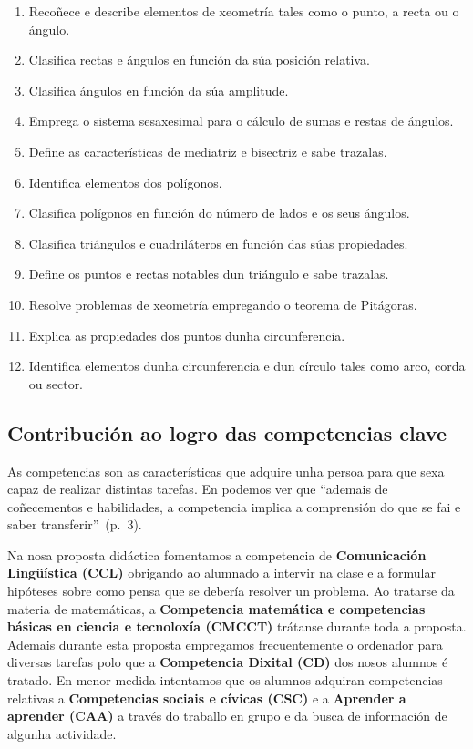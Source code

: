 \begin{enumerate}[label=\bfseries Est\arabic*]
 \item\label{est1} Recoñece e describe elementos de xeometría tales como o punto, a recta ou o ángulo.
 \item\label{est2} Clasifica rectas e ángulos en función da súa posición relativa.
 \item\label{est3} Clasifica ángulos en función da súa amplitude.
 \item\label{est4} Emprega o sistema sesaxesimal para o cálculo de sumas e restas de ángulos.
 \item\label{est5} Define as características de mediatriz e bisectriz e sabe trazalas.
 \item\label{est6} Identifica elementos dos polígonos.
 \item\label{est7} Clasifica polígonos en función do número de lados e os seus ángulos.
 \item\label{est8} Clasifica triángulos e cuadriláteros en función das súas propiedades.
 \item\label{est9} Define os puntos e rectas notables dun triángulo e sabe trazalas.
 \item\label{est10} Resolve problemas de xeometría empregando o teorema de Pitágoras.
 \item\label{est11} Explica as propiedades dos puntos dunha circunferencia.
 \item\label{est12} Identifica elementos dunha circunferencia e dun círculo tales como arco, corda ou sector.
\end{enumerate}

\subsection{Contribución ao logro das competencias clave}\label{sec-comp}
As competencias son as características que adquire unha persoa para que sexa capaz de realizar distintas tarefas. En  podemos ver que ``ademais de coñecementos e habilidades, a competencia implica a comprensión do que se fai e saber transferir''~(p.~3).

Na nosa proposta didáctica fomentamos a competencia de \textbf{Comunicación Lingüística (CCL)} obrigando ao alumnado a intervir na clase e a formular hipóteses sobre como pensa que se debería resolver un problema. Ao tratarse da materia de matemáticas, a \textbf{Competencia matemática e competencias básicas en ciencia e tecnoloxía (CMCCT)} trátanse durante toda a proposta. Ademais durante esta proposta empregamos frecuentemente o ordenador para diversas tarefas polo que a \textbf{Competencia Dixital (CD)} dos nosos alumnos é tratado. En menor medida intentamos que os alumnos adquiran competencias relativas a \textbf{Competencias sociais e cívicas (CSC)} e a \textbf{Aprender a aprender (CAA)} a través do traballo en grupo e da busca de información de algunha actividade.


